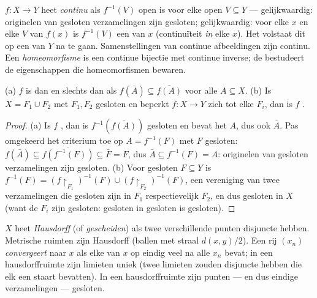 \begin{definition}\label{def:b3:topology:continuity}
$f \colon X \to Y$ heet \emph{continu}
als $f^{-1}(V)$ open is voor elke open $V \subseteq Y$ ---
gelijkwaardig: originelen van gesloten verzamelingen zijn
gesloten; gelijkwaardig: voor elke $x$ en elke  $V$ van
$f(x)$ is $f^{-1}(V)$ een  van $x$ (continuïteit \emph{in}
elke $x$). Het volstaat dit op een  van $Y$ na te gaan.
Samenstellingen van continue afbeeldingen zijn continu. Een
\emph{homeomorfisme} is een continue bijectie
met continue inverse; de  bestudeert de eigenschappen die
homeomorfismen bewaren.
\end{definition}

\begin{proposition}
\label{prop:b3:topology:gluing}
(a) $f$ is  dan en slechts dan als $f(\bar A) \subseteq
\overline{f(A)}$ voor alle $A \subseteq X$.
(b) Is $X = F_1 \cup F_2$ met $F_1, F_2$ gesloten en beperkt
$f\colon X \to Y$ zich  tot elke $F_i$, dan is $f$
.
\end{proposition}

\begin{proof}
(a) Is $f$ , dan is $f^{-1}(\overline{f(A)})$ gesloten en
bevat het $A$, dus ook $\bar A$. Pas omgekeerd het criterium toe
op $A = f^{-1}(F)$ met $F$ gesloten: $f(\bar A) \subseteq
\overline{f(f^{-1}(F))} \subseteq \bar F = F$, dus $\bar A
\subseteq f^{-1}(F) = A$: originelen van gesloten verzamelingen
zijn gesloten. (b) Voor gesloten $F \subseteq Y$ is $f^{-1}(F) =
(f\restriction_{F_1})^{-1}(F) \cup (f\restriction_{F_2})^{-1}(F)$,
een vereniging van twee verzamelingen die gesloten zijn in $F_1$
respectievelijk $F_2$, en dus gesloten in $X$ (want de $F_i$ zijn
gesloten: gesloten in gesloten is gesloten).
\end{proof}

\begin{definition}\label{def:b3:topology:hausdorff}
$X$ heet \emph{Hausdorff} (of
\emph{gescheiden}) als twee verschillende punten disjuncte
 hebben. Metrische ruimten zijn Hausdorff (ballen met
straal $d(x,y)/2$). Een rij $(x_n)$ \emph{convergeert} naar $x$
als elke  van $x$ op eindig veel na alle $x_n$ bevat; in
een hausdorffruimte zijn limieten uniek (twee limieten zouden
disjuncte  hebben die elk een staart bevatten). In een
hausdorffruimte zijn punten --- en dus eindige verzamelingen ---
gesloten.
\end{definition}

